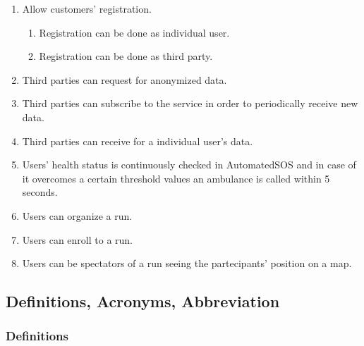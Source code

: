 \documentclass[a4paper]{article}
\begin{document}
    \begin{enumerate}[label*={G.\arabic*}]
        
        
        \item Allow customers' registration.
        \begin{enumerate}[label*=.\arabic*]
            \item Registration can be done as individual user.
            \item Registration can be done as third party.
        \end{enumerate}
        
        \item Third parties can request for anonymized data.
    
        \item Third parties can subscribe to the service in order to periodically receive new data.
            
        \item Third parties can receive for a individual user's data.
        
        \item Users' health status is continuously checked in AutomatedSOS and in case of it overcomes a certain threshold values an ambulance is called within 5 seconds.
        
        \item Users can organize a run.
        \item Users can enroll to a run.
        \item Users can be spectators of a run seeing the partecipants' position on a map.
        
    \end{enumerate}
    
    \subsection{Definitions, Acronyms, Abbreviation}
    
    \subsubsection{Definitions}
    
\end{document}
